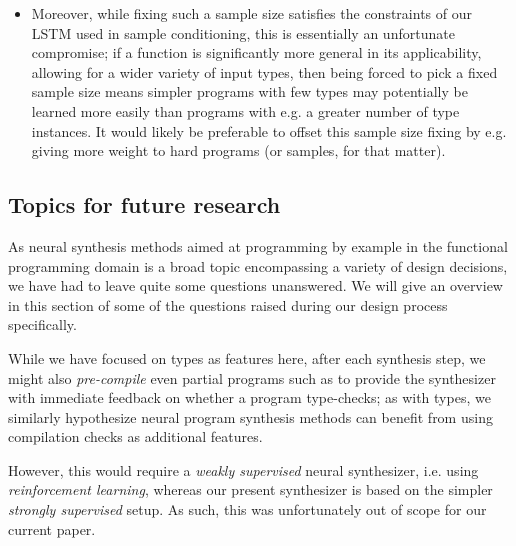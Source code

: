 \documentclass{article}
\begin{document}
\begin{itemize}
    \item
    Moreover, while fixing such a sample size satisfies the constraints of our LSTM used in sample conditioning,
    this is essentially an unfortunate compromise;
    if a function is significantly more general in its applicability,
    allowing for a wider variety of input types,
    then being forced to pick a fixed sample size means simpler programs with few types may potentially be learned more easily than programs with e.g. a greater number of type instances.
    It would likely be preferable to offset this sample size fixing by e.g. giving more weight to hard programs (or samples, for that matter).

\end{itemize}

\subsection{Topics for future research}

As neural synthesis methods aimed at programming by example in the functional
programming domain is a broad topic encompassing a variety of design decisions,
we have had to leave quite some questions unanswered.
We will give an overview in this section of some of the questions raised during our design process specifically.

    While we have focused on types as features here,
    after each synthesis step,
    we might also \emph{pre-compile} even partial programs such as to provide the synthesizer with immediate feedback on whether a program type-checks;
    as with types, we similarly hypothesize neural program synthesis methods can benefit from using compilation checks as additional features.

    However, this would require a \emph{weakly supervised} neural synthesizer,
    i.e. using \emph{reinforcement learning},
    whereas our present synthesizer is based on the simpler \emph{strongly supervised} setup.
    As such, this was unfortunately out of scope for our current paper.

\end{document}
